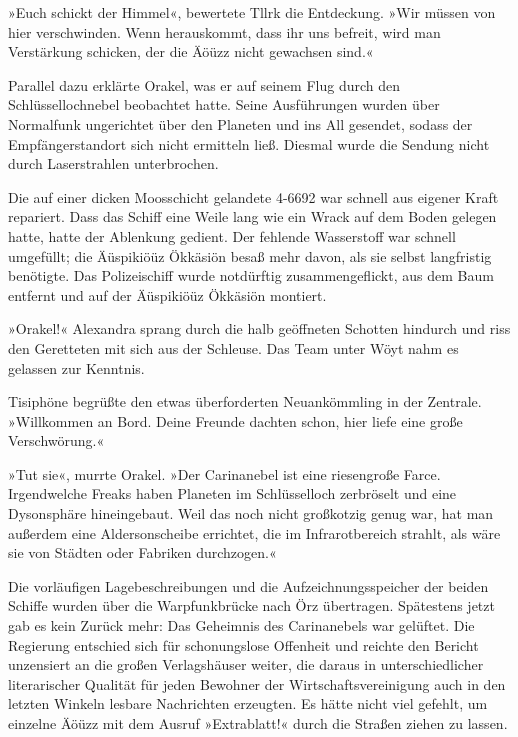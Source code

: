 »Euch schickt der Himmel«, bewertete Tllrk die Entdeckung. »Wir müssen von hier verschwinden. Wenn herauskommt, dass ihr uns befreit, wird man Verstärkung schicken, der die Äöüzz nicht gewachsen sind.«

Parallel dazu erklärte Orakel, was er auf seinem Flug durch den Schlüssellochnebel beobachtet hatte. Seine Ausführungen wurden über Normalfunk ungerichtet über den Planeten und ins All gesendet, sodass der Empfängerstandort sich nicht ermitteln ließ. Diesmal wurde die Sendung nicht durch Laserstrahlen unterbrochen.

Die auf einer dicken Moosschicht gelandete 4-6692 war schnell aus eigener Kraft repariert. Dass das Schiff eine Weile lang wie ein Wrack auf dem Boden gelegen hatte, hatte der Ablenkung gedient. Der fehlende Wasserstoff war schnell umgefüllt; die Äüspikiöüz Ökkäsiön besaß mehr davon, als sie selbst langfristig benötigte. Das Polizeischiff wurde notdürftig zusammengeflickt, aus dem Baum entfernt und auf der Äüspikiöüz Ökkäsiön montiert.

\cleardoubleevenpage



»Orakel!« Alexandra sprang durch die halb geöffneten Schotten hindurch und riss den Geretteten mit sich aus der Schleuse. Das Team unter Wöyt nahm es gelassen zur Kenntnis.

Tisiphöne begrüßte den etwas überforderten Neuankömmling in der Zentrale. »Willkommen an Bord. Deine Freunde dachten schon, hier liefe eine große Verschwörung.«

»Tut sie«, murrte Orakel. »Der Carinanebel ist eine riesengroße Farce. Irgendwelche Freaks haben Planeten im Schlüsselloch zerbröselt und eine Dysonsphäre hineingebaut. Weil das noch nicht großkotzig genug war, hat man außerdem eine Aldersonscheibe errichtet, die im Infrarotbereich strahlt, als wäre sie von Städten oder Fabriken durchzogen.«

Die vorläufigen Lagebeschreibungen und die Aufzeichnungsspeicher der beiden Schiffe wurden über die Warpfunkbrücke nach Örz übertragen. Spätestens jetzt gab es kein Zurück mehr: Das Geheimnis des Carinanebels war gelüftet. Die Regierung entschied sich für schonungslose Offenheit und reichte den Bericht unzensiert an die großen Verlagshäuser weiter, die daraus in unterschiedlicher literarischer Qualität für jeden Bewohner der Wirtschaftsvereinigung auch in den letzten Winkeln lesbare Nachrichten erzeugten. Es hätte nicht viel gefehlt, um einzelne Äöüzz mit dem Ausruf »Extrablatt!« durch die Straßen ziehen zu lassen.

